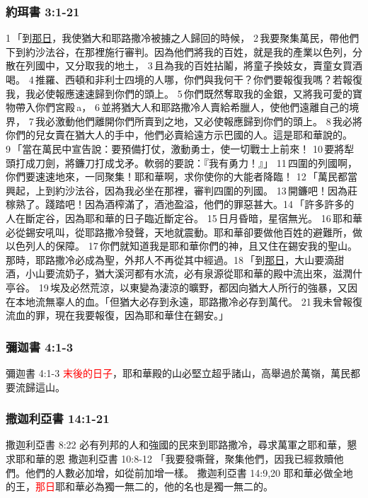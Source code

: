 \subsubsection{約珥書 3:1-21}
1 「到\underline{那日}，我使猶大和耶路撒冷被擄之人歸回的時候， 2 我要聚集萬民，帶他們下到約沙法谷，在那裡施行審判。因為他們將我的百姓，就是我的產業以色列，分散在列國中，又分取我的地土， 3 且為我的百姓拈鬮，將童子換妓女，賣童女買酒喝。 4 推羅、西頓和非利士四境的人哪，你們與我何干？你們要報復我嗎？若報復我，我必使報應速速歸到你們的頭上。 5 你們既然奪取我的金銀，又將我可愛的寶物帶入你們宮殿 a， 6 並將猶大人和耶路撒冷人賣給希臘人，使他們遠離自己的境界， 7 我必激動他們離開你們所賣到之地，又必使報應歸到你們的頭上。 8 我必將你們的兒女賣在猶大人的手中，他們必賣給遠方示巴國的人。這是耶和華說的。9 「當在萬民中宣告說：要預備打仗，激動勇士，使一切戰士上前來！ 10 要將犁頭打成刀劍，將鐮刀打成戈矛。軟弱的要說：『我有勇力！』」 11 四圍的列國啊，你們要速速地來，一同聚集！耶和華啊，求你使你的大能者降臨！ 12 「萬民都當興起，上到約沙法谷，因為我必坐在那裡，審判四圍的列國。 13 開鐮吧！因為莊稼熟了。踐踏吧！因為酒榨滿了，酒池盈溢，他們的罪惡甚大。14 「許多許多的人在斷定谷，因為耶和華的日子臨近斷定谷。 15 日月昏暗，星宿無光。 16 耶和華必從錫安吼叫，從耶路撒冷發聲，天地就震動。耶和華卻要做他百姓的避難所，做以色列人的保障。 17 你們就知道我是耶和華你們的神，且又住在錫安我的聖山。那時，耶路撒冷必成為聖，外邦人不再從其中經過。18 「到\underline{那日}，大山要滴甜酒，小山要流奶子，猶大溪河都有水流，必有泉源從耶和華的殿中流出來，滋潤什亭谷。 19 埃及必然荒涼，以東變為淒涼的曠野，都因向猶大人所行的強暴，又因在本地流無辜人的血。「但猶大必存到永遠，耶路撒冷必存到萬代。 21 我未曾報復流血的罪，現在我要報復，因為耶和華住在錫安。」


\subsubsection{彌迦書 4:1-3}
彌迦書 4:1-3
\textcolor{red}{末後的日子}，耶和華殿的山必堅立超乎諸山，高舉過於萬嶺，萬民都要流歸這山。

        
\subsubsection{撒迦利亞書 14:1-21}
撒迦利亞書 8:22
必有列邦的人和強國的民來到耶路撒冷，尋求萬軍之耶和華，懇求耶和華的恩
撒迦利亞書 10:8-12
「我要發嘶聲，聚集他們，因我已經救贖他們。他們的人數必加增，如從前加增一樣。
撒迦利亞書 14:9,20
耶和華必做全地的王，\textcolor{red}{那日}耶和華必為獨一無二的，他的名也是獨一無二的。

